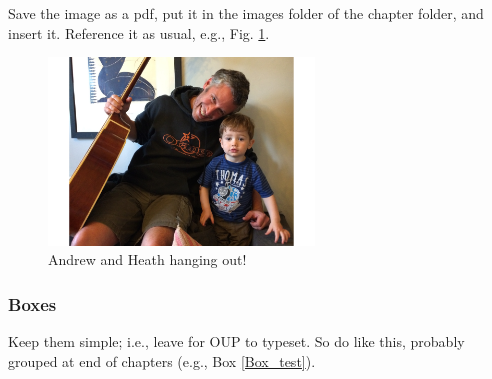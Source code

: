 \documentclass[10pt,a4paper]{book}\usepackage[]{graphicx}\usepackage[]{color}
\begin{document}
Save the image as a pdf, put it in the images folder of the chapter folder, and insert it. Reference it as usual, e.g., Fig. \ref{fig:Andrew_Heath}.


\begin{figure}[]
\centering
\includegraphics[width=200pt]{images/IMG_1199.pdf}
\caption{Andrew and Heath hanging out!}
\label{fig:Andrew_Heath}
\end{figure}


\newpage

\subsubsection{Boxes}

Keep them simple; i.e., leave for OUP to typeset. So do like this, probably grouped at end of chapters (e.g., Box \ref{Box_test}).
\end{document}
